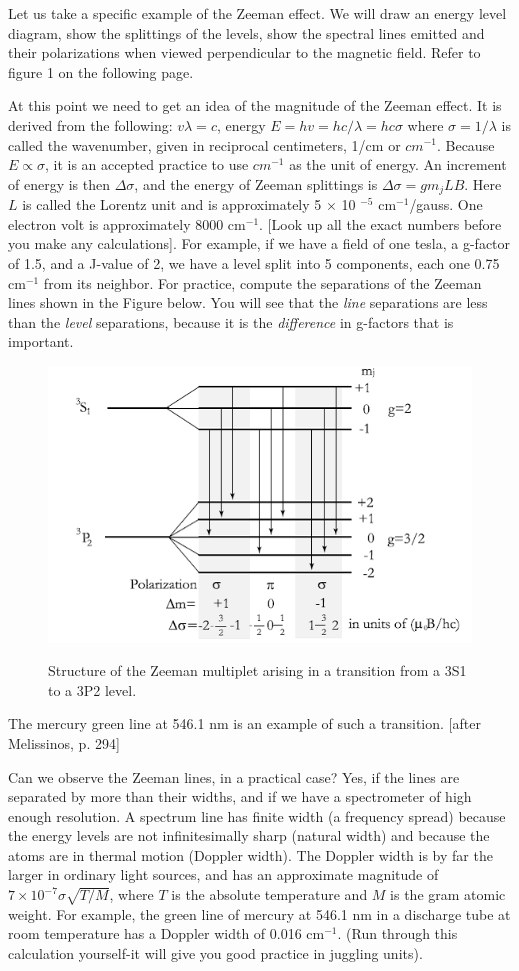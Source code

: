 \documentclass{../lab}
\begin{document}
Let us take a specific example of the Zeeman effect. We will draw an energy level diagram, show the splittings of the levels, show the spectral lines emitted and their polarizations when viewed perpendicular to the magnetic field. Refer to figure 1 on the following page.

At this point we need to get an idea of the magnitude of the Zeeman effect. It is derived from the following: $v \lambda = c$, energy $E = hv = hc / \lambda = hc \sigma$  where  $\sigma = 1 / \lambda$ is called the wavenumber, given in reciprocal centimeters, 1/cm or $cm^{-1}$. Because $E\propto\sigma$, it is an accepted practice to use $cm^{-1}$ as the unit of energy. An increment of energy is then $\Delta\sigma$, and the energy of Zeeman splittings is $\Delta\sigma = g m_j L B$. Here $L$ is called the Lorentz unit and is approximately 5 $\times$ 10 $^{-5}$ cm$^{-1}$/gauss. One electron volt is approximately 8000 cm$^{-1}$. [Look up all the exact numbers before you make any calculations]. For example, if we have a field of one tesla, a g-factor of 1.5, and a J-value of 2, we have a level split into 5 components, each one 0.75 cm$^{-1}$ from its neighbor. For practice, compute the separations of the Zeeman lines shown in the Figure below. You will see that the \emph{line} separations are less than the \emph{level} separations, because it is the \emph{difference} in g-factors that is important.

\begin{figure}[h]
    \centering
    \href{http://experimentationlab.berkeley.edu/sites/default/files/images/Atm1image003.gif}{\includegraphics[width=0.5\linewidth]{images/Atm1image003.png}}
    \caption{Structure of the Zeeman multiplet arising in a transition from a 3S1 to a 3P2 level.}
    \label{fig:Atm1image003}
\end{figure}

The mercury green line at 546.1 nm is an example of such a transition. [after Melissinos, p. 294]

Can we observe the Zeeman lines, in a practical case? Yes, if the lines are separated by more than their widths, and if we have a spectrometer of high enough resolution. A spectrum line has finite width (a frequency spread) because the energy levels are not infinitesimally sharp (natural width) and because the atoms are in thermal motion (Doppler width). The Doppler width is by far the larger in ordinary light sources, and has an approximate magnitude of $7 \times 10^{-7} \sigma \sqrt{T/M}$, where $T$ is the absolute temperature and $M$ is the gram atomic weight. For example, the green line of mercury at 546.1 nm in a discharge tube at room temperature has a Doppler width of 0.016 cm$^{-1}$. (Run through this calculation yourself-it will give you good practice in juggling units).
\end{document}

